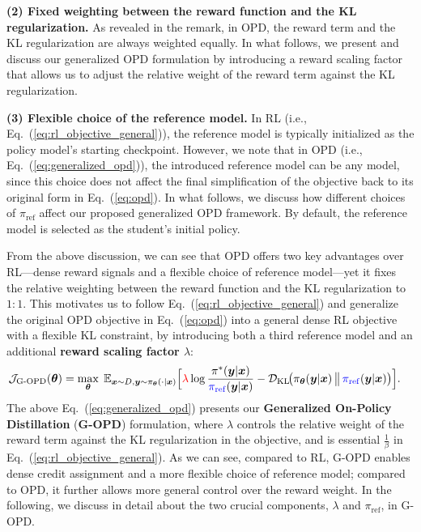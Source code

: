 \documentclass{article} %
\begin{document}
\textbf{(2) Fixed weighting between the reward function and the KL regularization.} As revealed in the remark, in OPD, the reward term and the KL regularization are always weighted equally. In what follows, we present and discuss our generalized OPD formulation by introducing a reward scaling factor that allows us to adjust the relative weight of the reward term against the KL regularization.

\textbf{(3) Flexible choice of the reference model.} In RL (i.e., Eq.~(\ref{eq:rl_objective_general})), the reference model is typically initialized as the policy model's starting checkpoint. However, we note that in OPD (i.e., Eq.~(\ref{eq:generalized_opd})), the introduced reference model can be any model, since this choice does not affect the final simplification of the objective back to its original form in Eq.~(\ref{eq:opd}). In what follows, we discuss how different choices of $\pi_{\mathrm{ref}}$ affect our proposed generalized OPD framework. By default, the reference model is selected as the student's initial policy.


From the above discussion, we can see that OPD offers two key advantages over RL—dense reward signals and a flexible choice of reference model—yet it fixes the relative weighting between the reward function and the KL regularization to $1:1$. This motivates us to follow Eq.~(\ref{eq:rl_objective_general}) and generalize the original OPD objective in Eq.~(\ref{eq:opd}) into a general dense RL objective with a flexible KL constraint, by introducing both a third reference model and an additional \textbf{reward scaling factor $\lambda$}:
\begin{equation}
\label{eq:generalized_opd}
\begin{aligned}
\mathcal{J}_{\text{G-OPD}}(\boldsymbol{\theta}) & =
\max_{\boldsymbol{\theta}}\;
\mathbb{E}_{\boldsymbol{x} \sim D, \boldsymbol{y} \sim \pi_{\boldsymbol{\theta}} (\cdot | \boldsymbol{x}) }\Big[ \textcolor{red}{\lambda}
\log  \frac{\pi^{*}(\boldsymbol{y}| \boldsymbol{x} )}{\textcolor{blue}{\pi_{\mathrm{ref}}} (\boldsymbol{y}| \boldsymbol{x} )}  - \mathcal{D}_{\mathrm{KL}} \!\big(
\pi_{\boldsymbol{\theta}}(\boldsymbol{y} | \boldsymbol{x})
\,\big\|\,
\textcolor{blue}{\pi_{\mathrm{ref}}}( \boldsymbol{y} | \boldsymbol{x})
\big)
\Big].
\end{aligned}
\end{equation}
The above Eq.~(\ref{eq:generalized_opd}) presents our \textbf{Generalized On-Policy Distillation} (\textbf{G-OPD}) formulation, where $\lambda$ controls the relative weight of the reward term against the KL regularization in the objective, and is essential $\frac{1}{\beta}$ in Eq.~(\ref{eq:rl_objective_general}). As we can see, compared to RL, G-OPD enables dense credit assignment and a more flexible choice of reference model; compared to OPD, it further allows more general control over the reward weight. In the following, we discuss in detail about the two crucial components, $\lambda$ and $\pi_{\mathrm{ref}}$, in G-OPD.
\end{document}
